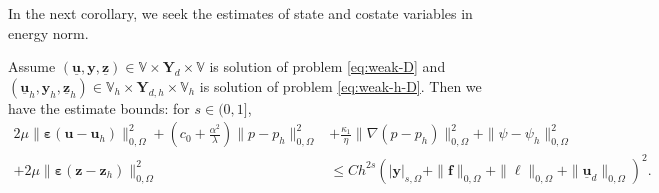 \documentclass[smallextended]{svjour3}
\numberwithin{equation}{section}
\numberwithin{figure}{section}
\numberwithin{table}{section}
\newcommand\bI{\mathbf{I}}
\newcommand\bPi{\boldsymbol{\Pi}}
\newcommand\ff{\boldsymbol{f}}
\newcommand\beps{\boldsymbol{\varepsilon}}
\newcommand{\tP}{\tilde{P}}
\newcommand\buu{\underline{\boldsymbol{u}}}
\newcommand\buz{\underline{\boldsymbol{z}}}
\newcommand\by{\boldsymbol{y}}
\newcommand\bu{\boldsymbol{u}}
\newcommand\bz{\boldsymbol{z}}
\newcommand{\bYd}{\boldsymbol{Y}_d}
\newcommand{\bY}{\boldsymbol{Y}}
\newcommand\cT{\mathcal{T}}
\newcommand{\bbV}{\mathbb{V}}
\begin{document}
\bigskip In the next corollary, we seek the estimates of state and costate variables in energy norm.
\begin{corollary}
	Assume $(\buu, \by, \buz) \in \bbV \times \bYd \times \bbV$ is solution of problem \eqref{eq:weak-D} and $(\buu_h, \by_h, \buz_h) \in \bbV_h \times \bY_{d,h} \times \bbV_h$ is solution of problem \eqref{eq:weak-h-D}. Then we have the estimate bounds: for $s \in (0, 1]$,
	\begin{align*}
		 2 \mu \| \beps (\bu - \bu_h)\|_{0, \Omega}^2  + \left( c_0 + \frac{\alpha^2}{\lambda} \right) \| p - p_h \|_{0, \Omega}^2   & + \frac{\kappa_1}{\eta} \| \nabla ( p - p_h)\|_{0, \Omega}^2 + \| \psi - \psi_h \|_{0, \Omega}^2   \\
		+ 2 \mu \| \beps(\bz - \bz_h)\|_{0, \Omega}^2 & \le C h^{2 s} \left(|\by|_{s, \Omega}+ 
        \|\ff\|_{0, \Omega} + \|\ell\|_{0, \Omega} + \|\buu_d\|_{0, \Omega} \right)^2.
	\end{align*}
\end{corollary}
\end{document}
